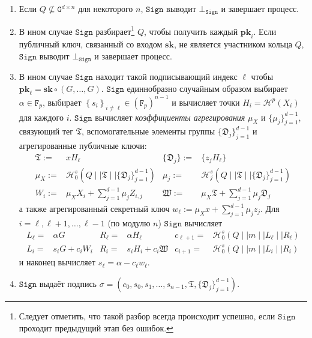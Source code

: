 \documentclass{llncs}
\newcommand{\F}{\texttt{F}_p}
\newcommand{\G}{\texttt{G}}
\newcommand{\Hp}{\mathcal{H}^p}
\newcommand{\Hs}{\mathcal{H}^s}
\begin{document}
\begin{definition}[$d$-CLSAG]
\begin{itemize}
\begin{enumerate}
\item Если $Q \not\subseteq \G^{d\times n}$ для некоторого $n$, $\texttt{Sign}$ выводит $\bot_{\texttt{Sign}}$ и завершает процесс.

\item В ином случае $\texttt{Sign}$ разбирает\footnote{Следует отметить, что такой разбор всегда происходит успешно, если $\texttt{Sign}$ проходит предыдущий этап без ошибок.} $Q$, чтобы получить каждый $\textbf{pk}_i$. Если публичный ключ, связанный со входом $\textbf{sk}$, не является участником кольца $Q$, $\texttt{Sign}$ выводит $\bot_{\texttt{Sign}}$ и завершает процесс.

\item В ином случае $\texttt{Sign}$ находит такой подписывающий индекс $\ell$ чтобы $\textbf{pk}_\ell = \textbf{sk} \circ (G, \ldots, G)$. $\texttt{Sign}$ единнобразно случайным образом выбирает $\alpha \in \F$, выбирает $\left\{s_i\right\}_{i \neq \ell} \in (\F)^{n-1}$ и вычисляет точки $H_i = \Hp(X_i)$ для каждого $i$. $\texttt{Sign}$ вычисляет \textit{коэффициенты агрегирования} $\mu_X$ и $\{\mu_j\}_{j=1}^{d-1}$, связующий тег $\mathfrak{T}$, вспомогательные элементы группы $\{\mathfrak{D}_j\}_{j=1}^{d-1}$ и агрегированные публичные ключи:
\begin{align*}
\mathfrak{T} :=& x H_\ell & \{\mathfrak{D}_j\} :=&  \{z_j H_\ell\} \\
\mu_X :=& \Hs_0(Q \mid \mid \mathfrak{T} \mid \mid \{\mathfrak{D}_j\}_{j=1}^{d-1})
 & \mu_j :=& \Hs_j(Q \mid \mid \mathfrak{T} \mid \mid \{\mathfrak{D}_j\}_{j=1}^{d-1}) \\
 W_i :=& \mu_X X_i + \sum_{j=1}^{d-1} \mu_j Z_{i,j} & \mathfrak{W} :=& \mu_X \mathfrak{T} + \sum_{j=1}^{d-1} \mu_j \mathfrak{D}_j
 \end{align*} а также агрегированный секретный ключ $w_\ell :=  \mu_X x + \sum_{j=1}^{d-1} \mu_j z_j$. Для $i = \ell, \ell+1, \ldots, \ell-1$ (по модулю $n$) $\texttt{Sign}$ вычисляет
\begin{align*}
L_\ell =& \alpha G & R_\ell =& \alpha H_\ell & c_{\ell+1} =& \Hs_0(Q \mid \mid m \mid \mid L_\ell \mid \mid R_\ell) \\
L_i =& s_i G + c_i W_i & R_i =& s_i H_i + c_i \mathfrak{W}
 & c_{i+1} =& \Hs_0(Q \mid \mid m \mid \mid L_i \mid \mid R_i)
\end{align*} и наконец вычисляет $s_\ell = \alpha - c_\ell w_\ell$.

\item $\texttt{Sign}$ выдаёт подпись $\sigma = (c_0, s_0, s_1, \ldots, s_{n-1}, \mathfrak{T}, \{\mathfrak{D}_j\}_{j=1}^{d-1})$.
\end{enumerate}


\end{itemize}
\end{definition}
\end{document}
